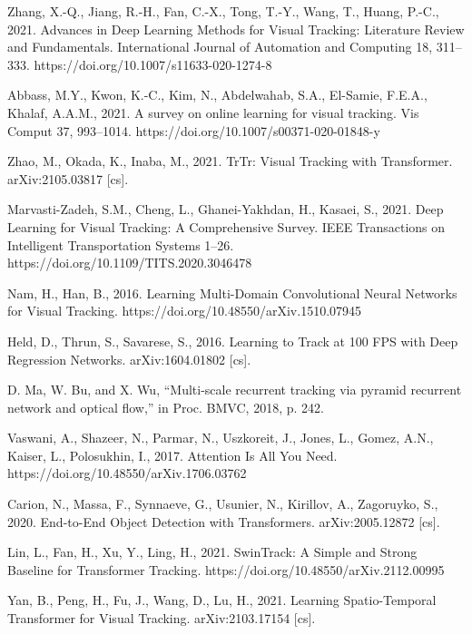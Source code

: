 \begin{thebibliography}{ widest-label }
	Zhang, X.-Q., Jiang, R.-H., Fan, C.-X., Tong, T.-Y., Wang, T., Huang, P.-C., 2021. Advances in Deep Learning Methods for Visual Tracking: Literature Review and Fundamentals. International Journal of Automation and Computing 18, 311–333. https://doi.org/10.1007/s11633-020-1274-8
	
	Abbass, M.Y., Kwon, K.-C., Kim, N., Abdelwahab, S.A., El-Samie, F.E.A., Khalaf, A.A.M., 2021. A survey on online learning for visual tracking. Vis Comput 37, 993–1014. https://doi.org/10.1007/s00371-020-01848-y
	
	Zhao, M., Okada, K., Inaba, M., 2021. TrTr: Visual Tracking with Transformer. arXiv:2105.03817 [cs].
	
	Marvasti-Zadeh, S.M., Cheng, L., Ghanei-Yakhdan, H., Kasaei, S., 2021. Deep Learning for Visual Tracking: A Comprehensive Survey. IEEE Transactions on Intelligent Transportation Systems 1–26. https://doi.org/10.1109/TITS.2020.3046478
	
	Nam, H., Han, B., 2016. Learning Multi-Domain Convolutional Neural Networks for Visual Tracking. https://doi.org/10.48550/arXiv.1510.07945
	
	Held, D., Thrun, S., Savarese, S., 2016. Learning to Track at 100 FPS with Deep Regression Networks. arXiv:1604.01802 [cs].
	
	D. Ma, W. Bu, and X. Wu, “Multi-scale recurrent tracking via pyramid recurrent network and optical flow,” in Proc. BMVC, 2018, p. 242.
	
	Vaswani, A., Shazeer, N., Parmar, N., Uszkoreit, J., Jones, L., Gomez, A.N., Kaiser, L., Polosukhin, I., 2017. Attention Is All You Need. https://doi.org/10.48550/arXiv.1706.03762
	
	Carion, N., Massa, F., Synnaeve, G., Usunier, N., Kirillov, A., Zagoruyko, S., 2020. End-to-End Object Detection with Transformers. arXiv:2005.12872 [cs].
	
	Lin, L., Fan, H., Xu, Y., Ling, H., 2021. SwinTrack: A Simple and Strong Baseline for Transformer Tracking. https://doi.org/10.48550/arXiv.2112.00995
	
	Yan, B., Peng, H., Fu, J., Wang, D., Lu, H., 2021. Learning Spatio-Temporal Transformer for Visual Tracking. arXiv:2103.17154 [cs].
	

\end{thebibliography}

